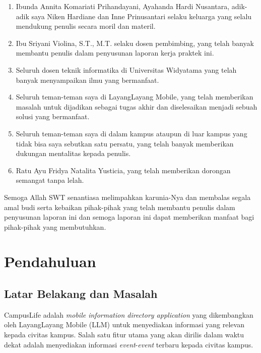 \documentclass[a4paper, 12pt, oneside]{report}
\begin{document}
\begin{enumerate}
  \item Ibunda Annita Komariati Prihandayani, Ayahanda Hardi Nusantara, adik-adik saya Niken Hardiane dan Inne Prinusantari selaku keluarga yang selalu mendukung penulis secara moril dan materil.
  \item Ibu Sriyani Violina, S.T., M.T. selaku dosen pembimbing, yang telah banyak membantu penulis dalam penyusunan laporan kerja praktek ini.
  \item Seluruh dosen teknik informatika di Universitas Widyatama yang telah banyak menyampaikan ilmu yang bermanfaat.
  \item Seluruh teman-teman saya di LayangLayang Mobile, yang telah memberikan masalah untuk dijadikan sebagai tugas akhir dan diselesaikan menjadi sebuah solusi yang bermanfaat.
  \item Seluruh teman-teman saya di dalam kampus ataupun di luar kampus yang
tidak bisa saya sebutkan satu persatu, yang telah banyak memberikan dukungan mentalitas kepada penulis.
  \item Ratu Ayu Fridya Natalita Yusticia, yang telah memberikan dorongan semangat tanpa lelah.
\end{enumerate}

\onehalfspacing Semoga Allah SWT senantiasa melimpahkan karunia-Nya dan membalas segala amal budi serta kebaikan pihak-pihak yang telah membantu penulis dalam penyusunan laporan ini dan semoga laporan ini dapat memberikan manfaat bagi pihak-pihak yang membutuhkan.

\onehalfspacing
{}
\tableofcontents
\setcounter{secnumdepth}{5}
\setcounter{tocdepth}{7}

\listoffigures

\listoftables

\chapter{Pendahuluan}
\section{Latar Belakang dan Masalah}
\onehalfspacing CampusLife adalah \textit{mobile information directory application} yang dikembangkan oleh LayangLayang Mobile (LLM) untuk menyediakan informasi yang relevan kepada civitas kampus. Salah satu fitur utama yang akan dirilis dalam waktu dekat adalah menyediakan informasi \textit{event}-\textit{event} terbaru kepada civitas kampus. 
\end{document}
